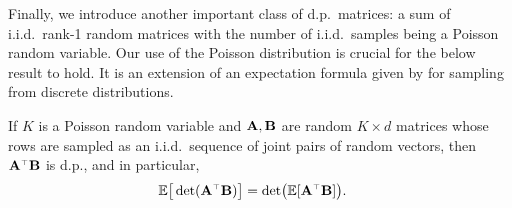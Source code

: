 \documentclass[11pt]{article}
\begin{document}
Finally, we introduce another important class of d.p.~matrices:
a sum of i.i.d.~rank-1 random matrices with the number of
i.i.d.~samples being a Poisson random variable. Our use of the Poisson
distribution is crucial for the below result to hold. It is an
extension of an expectation formula given by \cite{dpp-intermediate}
for sampling from discrete distributions.
\begin{lemma}\label{l:poisson}
If $K$ is a Poisson random variable and $\mathbf A,\mathbf B$ are random $K\times d$
matrices whose rows  are sampled as an i.i.d.~sequence of joint pairs of
random vectors, then $\A^\top\B$ is d.p., and in particular,
\begin{align*}
  \E\big[\det(\A^\top\B)\big] &= \det\!\big(\E[\A^\top\B]\big).
  \end{align*}
\end{lemma}
\end{document}

